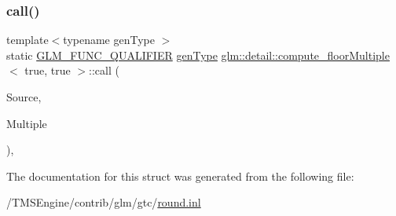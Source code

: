\subsubsection{\texorpdfstring{call()}{call()}}
{\footnotesize\ttfamily template$<$typename gen\+Type $>$ \\
static \hyperlink{setup_8hpp_a33fdea6f91c5f834105f7415e2a64407}{G\+L\+M\+\_\+\+F\+U\+N\+C\+\_\+\+Q\+U\+A\+L\+I\+F\+I\+ER} \hyperlink{structglm_1_1detail_1_1gen_type}{gen\+Type} \hyperlink{structglm_1_1detail_1_1compute__floor_multiple}{glm\+::detail\+::compute\+\_\+floor\+Multiple}$<$ true, true $>$\+::call (\begin{DoxyParamCaption}\item[{\hyperlink{structglm_1_1detail_1_1gen_type}{gen\+Type}}]{Source,  }\item[{\hyperlink{structglm_1_1detail_1_1gen_type}{gen\+Type}}]{Multiple }\end{DoxyParamCaption})\hspace{0.3cm}{\ttfamily [inline]}, {\ttfamily [static]}}



The documentation for this struct was generated from the following file\+:\begin{DoxyCompactItemize}
\item 
/\+T\+M\+S\+Engine/contrib/glm/gtc/\hyperlink{round_8inl}{round.\+inl}\end{DoxyCompactItemize}
